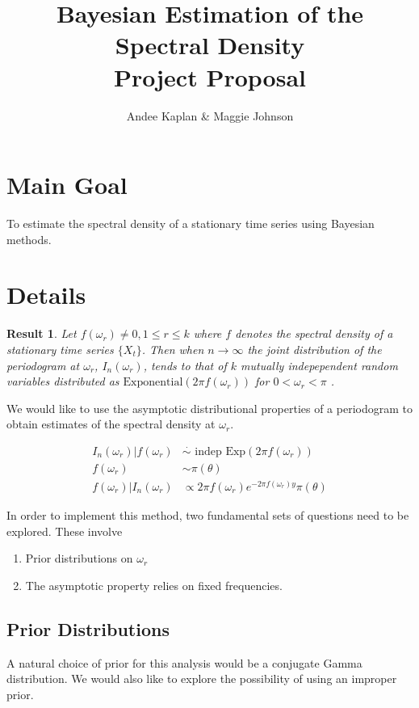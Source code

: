 \documentclass{article}\usepackage[]{graphicx}\usepackage[]{color}
\title{Bayesian Estimation of the Spectral Density \\ {\small Project Proposal}}
\author{Andee Kaplan \& Maggie Johnson}
\newcommand{\mj}[1]{{\color{blue} #1}}
\theoremstyle{plain}
\newtheorem*{res}{Result}
\begin{document}
\maketitle

\section*{Main Goal}
To estimate the spectral density of a stationary time series using Bayesian methods.

\section*{Details}
\begin{res}
Let $f(\omega_r) \not= 0, 1 \le r \le k$ where $f$ denotes the spectral density of a stationary time series $\{X_t\}$. Then when $n\rightarrow \infty$ the joint distribution of the periodogram at $\omega_r$, $I_n(\omega_r)$, tends to that of $k$ mutually indepependent random variables distributed as $\text{Exponential}(2\pi f(\omega_r))$ for $0<\omega_r<\pi$ \cite{JAZ:4921656}.
\end{res}

We would like to use the asymptotic distributional properties of a periodogram to obtain estimates of the spectral density at $\omega_r$.

\begin{align*}
I_n(\omega_r) |f(\omega_r) &\stackrel{\cdot}{\sim}\text{ indep } \text{Exp}(2\pi f(\omega_r)) \\
f(\omega_r) & \sim \pi(\theta)\\
f(\omega_r) | I_n(\omega_r) &\propto 2\pi f(\omega_r) e^{-2\pi f(\omega_r) y} \pi(\theta)
\end{align*}

\mj{In order to implement this method, two fundamental sets of questions need to be explored. These involve
\begin{enumerate}
\item Prior distributions on $\omega_r$
\item The asymptotic property relies on fixed frequencies.
\end{enumerate}
}

\subsection*{Prior Distributions}
A natural choice of prior for this analysis would be a \mj{conjugate Gamma distribution}. We would also like to explore the possibility of using an improper prior.
\end{document}
